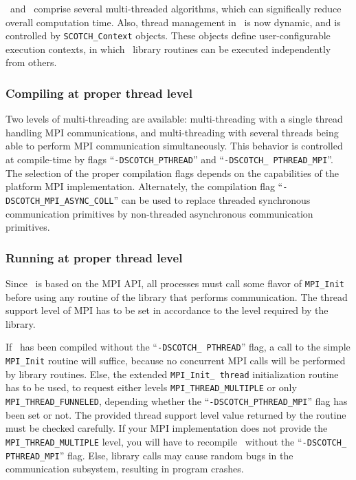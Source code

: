 \scotch\ and \ptscotch\ comprise several multi-threaded algorithms,
which can significally reduce overall computation time. Also, thread
management in \scotch\ is now dynamic, and is controlled by
\texttt{SCOTCH\_\lbt Context} objects. These objects define
user-configurable execution contexts, in which \libptscotch\ library
routines can be executed independently from others.

\subsubsection{Compiling at proper thread level}

Two levels of multi-threading are available: multi-threading with a
single thread handling MPI communications, and multi-threading with
several threads being able to perform MPI communication
simultaneously. This behavior is controlled at compile-time by flags
``\texttt{-DSCOTCH\_\lbt PTHREAD}'' and ``\texttt{-DSCOTCH\_\lbt
PTHREAD\_\lbt MPI}''. The selection of the proper compilation flags
depends on the capabilities of the platform MPI
implementation. Alternately, the compilation flag
``\texttt{-DSCOTCH\_\lbt MPI\_\lbt ASYNC\_\lbt COLL}'' can be
used to replace threaded synchronous communication primitives by
non-threaded asynchronous communication primitives.

\subsubsection{Running at proper thread level}

Since \ptscotch\ is based on the MPI API, all processes must call some
flavor of \texttt{MPI\_\lbt Init} before using any routine of the
library that performs communication. The thread support level of MPI
has to be set in accordance to the level required by the library.

If \ptscotch\ has been compiled without the ``\texttt{-DSCOTCH\_\lbt
PTHREAD}'' flag, a call to the simple \texttt{MPI\_\lbt Init} routine
will suffice, because no concurrent MPI calls will be performed by
library routines. Else, the extended \texttt{MPI\_\lbt Init\_\lbt
thread} initialization routine has to be used, to request either
levels \texttt{MPI\_\lbt THREAD\_\lbt MULTIPLE} or only
\texttt{MPI\_\lbt THREAD\_\lbt FUNNELED}, depending whether the
``\texttt{-DSCOTCH\_\lbt PTHREAD\_\lbt MPI}'' flag has been set or
not. The provided thread support level value returned by the routine
must be checked carefully. If your MPI implementation does not provide
the \texttt{MPI\_\lbt THREAD\_\lbt MULTIPLE} level, you will have to
recompile \ptscotch\ without the ``\texttt{-DSCOTCH\_\lbt
PTHREAD\_\lbt MPI}'' flag. Else, library calls may cause random bugs
in the communication subsystem, resulting in program crashes.

